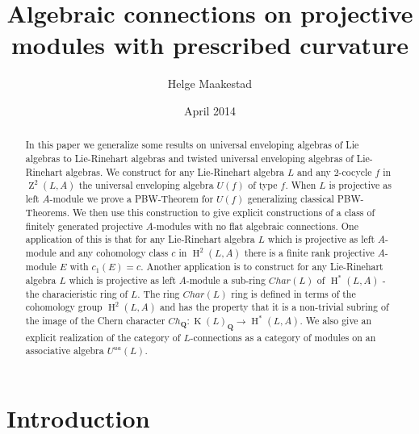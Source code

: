 \documentclass{amsart}
\theoremstyle{plain}
\theoremstyle{definition}
\theoremstyle{remark}
\numberwithin{equation}{theorem}
\begin{document}
\title{Algebraic connections on projective modules with prescribed curvature}

\author{Helge Maakestad }



\date{April 2014} 

\begin{abstract} In this paper we generalize some
results on universal enveloping algebras of Lie algebras to Lie-Rinehart algebras and twisted universal enveloping algebras
of Lie-Rinehart algebras. We construct for any Lie-Rinehart algebra $L$ and any 2-cocycle $f$ in ${\operatorname{Z}}^2(L,{A})$ 
the universal enveloping algebra $U(f)$ of type $f$. When $L$ is projective as left ${A}$-module we prove a PBW-Theorem
for $U(f)$ generalizing classical PBW-Theorems. We then use this construction to give explicit constructions of a
class of finitely generated projective ${A}$-modules with no flat algebraic connections.
One application of this is that for any Lie-Rinehart algebra $L$ which is projective
as left ${A}$-module and any cohomology class $c$ in ${\operatorname{H} }^2(L,{A})$ there is a finite rank projective ${A}$-module $E$ with
$c_1(E)=c$. 
Another application is to construct for any Lie-Rinehart algebra $L$ which is projective as left ${A}$-module
a sub-ring $Char(L)$ of ${\operatorname{H} }^*(L,{A})$ - the characieristic ring of $L$. The ring $Char(L)$ ring is defined in terms of
the cohomology group ${\operatorname{H} }^2(L,{A})$ and has the property that it is a non-trivial subring of
the image of the Chern character $Ch_{\mathbf{Q} }:{\operatorname{K}}(L)_{\mathbf{Q} }\rightarrow {\operatorname{H} }^*(L,{A})$. 
We also give an explicit realization of the category of $L$-connections as a category of modules
on an associative algebra ${U^{ua}}(L)$.
\end{abstract}

\maketitle
\tableofcontents

\section{Introduction}
\end{document}
